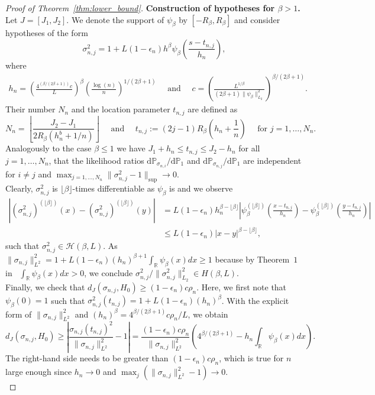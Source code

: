 \documentclass[10.5pt,letter]{article}
\numberwithin{equation}{section}
\theoremstyle{definition}
\newcommand{\R}{\mathbb{R}}
\renewcommand{\P}{\mathbb{P}}
\newcommand{\1}{\mathbbm{1}}
\begin{document}
\begin{proof}[Proof of Theorem~\ref{thm:lower_bound}]
\textbf{Construction of hypotheses for $\beta> 1$.}
Let $J=[J_1,J_2]$. We denote the support of $\psi_\beta$ by $[-R_\beta,R_\beta]$ and consider hypotheses of the form \vspace{-0.1cm}
\[ \sigma_{n,j}^2=1+L(1-\epsilon_n)h^{\beta}\psi_{\beta}\left(\frac{s-t_{n,j}}{h_n}\right),\]
where
\begin{align}\label{eq:alternativebetage1}
     h_n=\left(\frac{4^{\left(\beta/(2\beta+1)\right)}c}{L}\right)^\beta\left(\frac{\log(n)}{n}\right)^{1/(2\beta+1)} \quad\textrm{ and }\quad c=\left(\frac{L^{1/\beta}}{(2\beta+1)\|\psi_{\beta}\|^2_{L_2}}\right)^{\beta/(2\beta+1)}.
\end{align}
Their number $N_n$ and the location parameter $t_{n,j}$ are defined as
\[ N_n = \left\lfloor \frac{J_2-J_1}{2R_\beta(h_n^b+1/n)}\right\rfloor \quad\textrm{ and }\quad t_{n,j} := (2j-1)R_\beta\left( h_n + \frac1n\right) \quad \textrm{ for } j=1,\dots, N_n.\]
Analogously to the case $\beta\leq 1$ we have $J_1+h_n\leq t_{n,j}\leq J_2-h_n$ for all $j=1,\dots, N_n$, that the likelihood ratios $\textrm{d}\P_{\sigma_{n,i}}/\textrm{d}\P_1$ and $\textrm{d}\P_{\sigma_{n,j}}/\textrm{d}\P_1$ are independent for $i\neq j$ and $\max_{j=1,\dots, N_n}\|\sigma_{n,j}^2-1\|_{\sup}\rightarrow 0$.\\
Clearly, $\sigma_{n,j}^2$ is $\lfloor\beta\rfloor$-times differentiable as $\psi_\beta$ is and we observe
\begin{align*}
    \left|(\sigma_{n,j}^2)^{(\lfloor \beta \rfloor)}(x)- (\sigma_{n,j}^2)^{(\lfloor \beta \rfloor)}(y)\right|
    &= L(1-\epsilon_n)h_n^{\beta-\lfloor \beta \rfloor} \left| \psi_{\beta}^{(\lfloor \beta \rfloor)}\left(\frac{x-t_{n,j}}{h_n}\right)- \psi_{\beta}^{(\lfloor \beta \rfloor)}\left(\frac{y-t_{n,j}}{h_n}\right)\right|\\
    &\leq L(1-\epsilon_n)|x-y|^{\beta -\lfloor \beta \rfloor},
\end{align*}
such that $\sigma_{n,j}^2\in\mathcal{H}(\beta,L)$. As $ \|\sigma_{n,j}\|_{L^2}^2 = 1 + L(1-\epsilon_n) (h_n)^{\beta+1}\int_\R \psi_\beta(x)dx \geq 1$ because by Theorem~$1$ in~\cite{Leonov} $\int_\R\psi_\beta(x)dx>0$, we conclude $\sigma^2_{n,j}/\| \sigma^2_{n,j}\|_{L_2}^2 \in H(\beta,L)$. \\
Finally, we check that $d_J(\sigma_{n,j},H_0)\geq (1-\epsilon_n)c\rho_n$. Here, we first note that $\psi_\beta(0)=1$ such that $\sigma_{n,j}^2(t_{n,j}) = 1+L(1-\epsilon_n)(h_n)^\beta$. With the explicit form of $\|\sigma_{n,j}\|_{L^2}^2$ and $(h_n)^\beta  = 4^{\beta/(2\beta+1)}c\rho_n/L$, we obtain
\[ d_J(\sigma_{n,j},H_0)\geq \left|\frac{\sigma_{n,j}(t_{n,j})^2}{\|\sigma_{n,j}\|_{L^2}^2} -1\right| = \frac{(1-\epsilon_n)c\rho_n}{\|\sigma_{n,j}\|_{L^2}^2}  \left( 4^{\beta/(2\beta+1)}- h_n\int_\R \psi_\beta(x)dx \right).\]
The right-hand side needs to be greater than $(1-\epsilon_n)c\rho_n$, which is true for $n$ large enough since $h_n\to 0$ and $\max_j(\|\sigma_{n,j}\|_{L^2}^2-1)\rightarrow 0$.\\




\end{proof}
\end{document}
